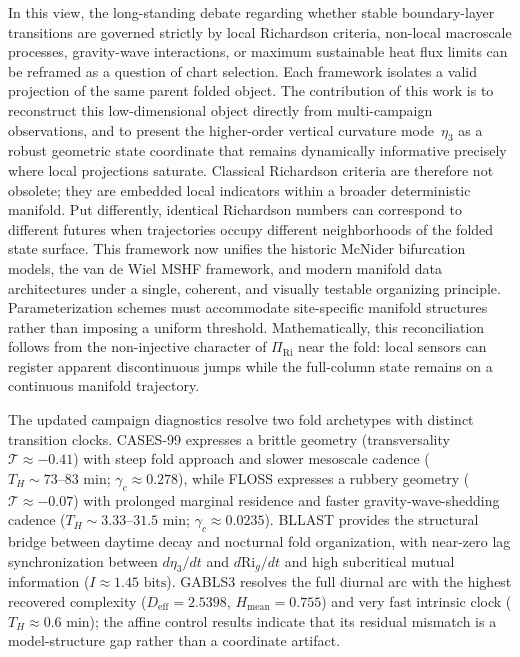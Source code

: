 \documentclass[12pt,a4paper]{article}
\newcommand{\Rig}{\mathrm{Ri}_g}
\begin{document}
In this view, the long-standing debate regarding whether stable boundary-layer transitions are governed strictly by local Richardson criteria, non-local macroscale processes, gravity-wave interactions, or maximum sustainable heat flux limits can be reframed as a question of chart selection. Each framework isolates a valid projection of the same parent folded object. The contribution of this work is to reconstruct this low-dimensional object directly from multi-campaign observations, and to present the higher-order vertical curvature mode~$\eta_3$ as a robust geometric state coordinate that remains dynamically informative precisely where local projections saturate. Classical Richardson criteria are therefore not obsolete; they are embedded local indicators within a broader deterministic manifold. Put differently, identical Richardson numbers can correspond to different futures when trajectories occupy different neighborhoods of the folded state surface. This framework now unifies the historic McNider bifurcation models, the van de Wiel MSHF framework, and modern manifold data architectures under a single, coherent, and visually testable organizing principle. Parameterization schemes must accommodate site-specific manifold structures rather than imposing a uniform threshold.
Mathematically, this reconciliation follows from the non-injective character of $\Pi_{\mathrm{Ri}}$ near the fold: local sensors can register apparent discontinuous jumps while the full-column state remains on a continuous manifold trajectory.

The updated campaign diagnostics resolve two fold archetypes with distinct transition clocks. CASES-99 expresses a brittle geometry (transversality $\mathcal{T} \approx -0.41$) with steep fold approach and slower mesoscale cadence ($T_H \sim 73\text{--}83\text{~min}$; $\gamma_c \approx 0.278$), while FLOSS expresses a rubbery geometry ($\mathcal{T} \approx -0.07$) with prolonged marginal residence and faster gravity-wave-shedding cadence ($T_H \sim 3.33\text{--}31.5\text{~min}$; $\gamma_c \approx 0.0235$). BLLAST provides the structural bridge between daytime decay and nocturnal fold organization, with near-zero lag synchronization between $d\eta_3/dt$ and $d\Rig/dt$ and high subcritical mutual information ($I \approx 1.45\text{~bits}$). GABLS3 resolves the full diurnal arc with the highest recovered complexity ($D_{\mathrm{eff}}=2.5398$, $H_{\mathrm{mean}}=0.755$) and very fast intrinsic clock ($T_H \approx 0.6\text{~min}$); the affine control results indicate that its residual mismatch is a model-structure gap rather than a coordinate artifact.
\end{document}
